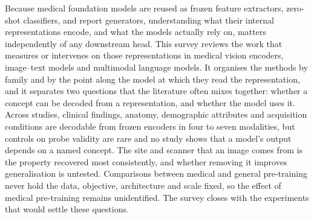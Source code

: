 Because medical foundation models are reused as frozen feature extractors, zero-shot classifiers, and report generators, understanding what their internal representations encode, and what the models actually rely on, matters independently of any downstream head. This survey reviews the work that measures or intervenes on those representations in medical vision encoders, image–text models and multimodal language models. It organises the methods by family and by the point along the model at which they read the representation, and it separates two questions that the literature often mixes together: whether a concept can be decoded from a representation, and whether the model uses it. Across \Ncore{} studies, clinical findings, anatomy, demographic attributes and acquisition conditions are decodable from frozen encoders in four to seven modalities, but controls on probe validity are rare and no study shows that a model's output depends on a named concept. The site and scanner that an image comes from is the property recovered most consistently, and whether removing it improves generalisation is untested. Comparisons between medical and general pre-training never hold the data, objective, architecture and scale fixed, so the effect of medical pre-training remains unidentified. The survey closes with the experiments that would settle these questions.
